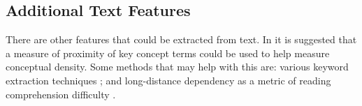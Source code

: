 \documentclass[12pt]{article}
\theoremstyle{grammarstyle}
\begin{document}


\subsection{Additional Text Features}
There are other features that could be extracted from text.
In \citep{robins2010learning} it is suggested that a measure of proximity of key concept terms could be used to help measure conceptual density. Some methods that may help with this are: various keyword extraction techniques \citep{mihalcea2004textrank, matsuo2004keyword, ercan2007using, rose2010automatic}; and long-distance dependency as a metric of reading comprehension difficulty \citep{liu2008dependency}. 
\end{document}
